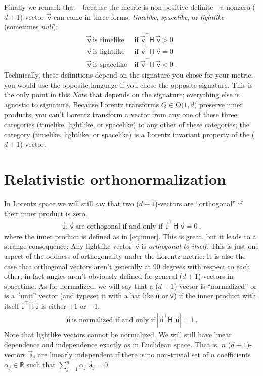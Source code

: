 \documentclass{article}
\newcommand{\metric}{\mathsf{H}}
\newcommand\upvec[1]{\!\vec{\,\mathrm{#1}}}
\newcommand{\Lvec}[1]{\upvec{\mathsf{#1}}} %
\newcommand{\Lhat}[1]{\hat{\mathsf{#1}}} %
\newcommand{\plus}{\!+\!} %
\newcommand{\documentname}{\textsl{Note}}
\begin{document}
Finally we remark that---because the metric is non-positive-definite---a nonzero ($d\plus1$)-vector $\Lvec{v}$ can come in three forms, \emph{timelike}, \emph{spacelike}, or \emph{lightlike} (sometimes \emph{null}):
\begin{align}
    \Lvec{v} ~ \mbox{is timelike}  &~ \mbox{if} ~ \Lvec{v}^\top\metric\,\Lvec{v} > 0 \label{eq:timelike}\\
    \Lvec{v} ~ \mbox{is lightlike} &~ \mbox{if} ~ \Lvec{v}^\top\metric\,\Lvec{v} = 0 \label{eq:lightlike}\\
    \Lvec{v} ~ \mbox{is spacelike} &~ \mbox{if} ~ \Lvec{v}^\top\metric\,\Lvec{v} < 0 ~.\label{eq:spacelike}
\end{align}
Technically, these definitions depend on the signature you chose for your metric; you would use the opposite language if you chose the opposite signature.
This is the only point in this \documentname{} that depends on the signature; everything else is agnostic to signature.
Because Lorentz transforms $Q\in\mbox{O($1,d$)}$ preserve inner products, you can't Lorentz transform a vector from any one of these three categories (timelike, lightlike, or spacelike) to any other of these categories; the category (timelike, lightlike, or spacelike) is a Lorentz invariant property of the ($d\plus1$)-vector.

\section{Relativistic orthonormalization}\label{sec:orth}

In Lorentz space we will still say that two ($d\plus1$)-vectors are ``orthogonal'' if their inner product is zero.
\begin{align}
    \Lvec{u},\Lvec{v} ~ \mbox{are orthogonal if and only if} ~ \Lvec{u}^\top\metric\,\Lvec{v}=0 ~,
\end{align}
where the inner product is defined as in \eqref{eq:inner}.
This is great, but it leads to a strange consequence:
Any lightlike vector $\Lvec{v}$ is \emph{orthogonal to itself}.
This is just one aspect of the oddness of orthogonality under the Lorentz metric:
It is also the case that orthogonal vectors aren't generally at 90 degrees with respect to each other; in fact angles aren't obviously defined for general ($d\plus1$)-vectors in spacetime.
As for normalized, we will say that a ($d\plus1$)-vector is ``normalized'' or is a ``unit'' vector (and typeset it with a hat like $\Lhat{u}$ or $\Lhat{v}$) if the inner product with itself $\Lhat{u}^\top\metric\,\Lhat{u}$ is either $+1$ or $-1$.
\begin{align}
    \Lvec{u} ~ \mbox{is normalized if and only if} ~ |\Lvec{u}^\top\metric\,\Lvec{u}| = 1 ~.
\end{align}
Note that lightlike vectors cannot be normalized. We will still have linear dependence and independence exactly as in Euclidean space.
That is, $n$ ($d\plus1$)-vectors $\Lvec{a}_j$ are linearly independent if there is no non-trivial set of $n$ coefficients $\alpha_j\in\mathbb{R}$ such that $\sum_{j=1}^n \alpha_j\,\Lvec{a}_j = 0$.
\end{document}

